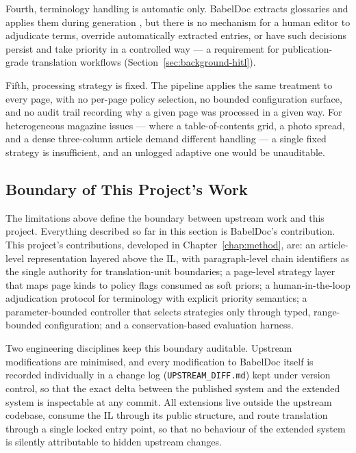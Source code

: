Fourth, terminology handling is automatic only. BabelDoc extracts
glossaries and applies them during generation \cite{qi2026babeldoc},
but there is no mechanism for a human editor to adjudicate terms,
override automatically extracted entries, or have such decisions
persist and take priority in a controlled way --- a requirement for
publication-grade translation workflows
(Section~\ref{sec:background-hitl}).

Fifth, processing strategy is fixed. The pipeline applies the same
treatment to every page, with no per-page policy selection, no bounded
configuration surface, and no audit trail recording why a given page
was processed in a given way. For heterogeneous magazine issues ---
where a table-of-contents grid, a photo spread, and a dense three-column
article demand different handling --- a single fixed strategy is
insufficient, and an unlogged adaptive one would be unauditable.

\subsection{Boundary of This Project's Work}

The limitations above define the boundary between upstream work and
this project. Everything described so far in this section is BabelDoc's
contribution. This project's contributions, developed in
Chapter~\ref{chap:method}, are: an article-level representation layered
above the IL, with paragraph-level chain identifiers as the single
authority for translation-unit boundaries; a page-level strategy layer
that maps page kinds to policy flags consumed as soft priors; a
human-in-the-loop adjudication protocol for terminology with explicit
priority semantics; a parameter-bounded controller that selects
strategies only through typed, range-bounded configuration; and a
conservation-based evaluation harness.

Two engineering disciplines keep this boundary auditable. Upstream
modifications are minimised, and every modification to BabelDoc itself
is recorded individually in a change log (\texttt{UPSTREAM\_DIFF.md})
kept under version control, so that the exact delta between the
published system and the extended system is inspectable at any commit.
All extensions live outside the upstream codebase, consume the IL
through its public structure, and route translation through a single
locked entry point, so that no behaviour of the extended system is
silently attributable to hidden upstream changes.

